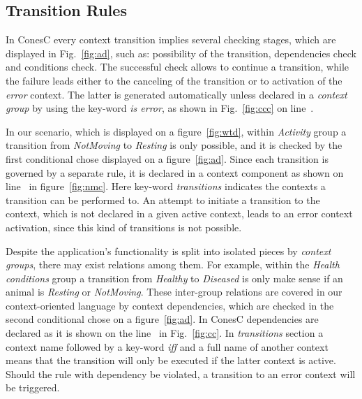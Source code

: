 
\subsection{Transition Rules}\label{subsec:rules}

In ConesC every context transition implies several checking stages, which are displayed in
Fig.~\ref{fig:ad}, such as: possibility of the transition, dependencies check and conditions
check. The successful check allows to continue a transition, while the failure leads either to
the canceling of the transition or to activation of the \emph{error} context. The latter is generated
automatically unless declared in a \emph{context group} by using the key-word \emph{is error},
as shown in Fig.~\ref{fig:ccc} on line~.


In our scenario, which is displayed on a figure~\ref{fig:wtd}, within \emph{Activity} group a
transition from \emph{NotMoving} to \emph{Resting} is only possible, and it is checked
by the first conditional chose displayed on a figure~\ref{fig:ad}.
Since each transition is governed by a separate rule, it is declared in a context component as shown
on line~ in figure~\ref{fig:nmc}. Here key-word \emph{transitions}
indicates the contexts a transition can be performed to. An attempt to initiate
a transition to the context, which is not declared in a given active context, leads to an error context
activation, since this kind of transitions is not possible.


Despite the application's  functionality is split into isolated pieces by \emph{context groups},
there may exist relations among them. For example, within the 
\emph{Health conditions} group a transition from \emph{Healthy} to \emph{Diseased} is only
make sense if an animal is \emph{Resting} or \emph{NotMoving}. These inter-group
relations are covered in our context-oriented language by context dependencies,
which are checked in the second conditional chose on a figure~\ref{fig:ad}. In
ConesC dependencies are declared as it is shown on the line~
in Fig.~\ref{fig:cc}. In \emph{transitions} section a context name followed by a
key-word \emph{iff} and a full name of another context means that
the transition will only be executed if the latter context is active. Should the
rule with dependency be violated, a transition to an error context will be triggered.

